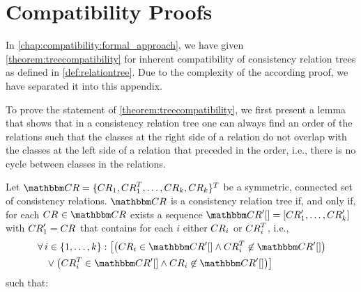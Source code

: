 \chapter{Compatibility Proofs}
\label{chap:appendix:compatibility_proofs}

In \autoref{chap:compatibility:formal_approach}, we have given \autoref{theorem:treecompatibility} for inherent compatibility of consistency relation trees as defined in \autoref{def:relationtree}.
Due to the complexity of the according proof, we have separated it into this appendix.

To prove the statement of \autoref{theorem:treecompatibility}, we first present a lemma that shows that in a consistency relation tree one can always find an order of the relations such that the classes at the right side of a relation do not overlap with the classes at the left side of a relation that preceded in the order, i.e., there is no cycle between classes in the relations.

\begin{lemma} \label{lemma:treehassequence}
    Let $\consistencyrelationset{CR} = \setted{\consistencyrelation{CR}{1}, \consistencyrelation{CR}{1}^T, \dots, \consistencyrelation{CR}{k}, \consistencyrelation{CR}{k}}^T$ be a symmetric, connected set of consistency relations.
    $\consistencyrelationset{CR}$ is a consistency relation tree if, and only if, for each $\consistencyrelation{CR}{} \in \consistencyrelationset{CR}$ exists a sequence $\sequence{\consistencyrelationset{CR}'} = \sequenced{\consistencyrelation{CR}{1}', \dots, \consistencyrelation{CR}{k}'}$ with $\consistencyrelation{CR}{1}' = \consistencyrelation{CR}{}$ that contains for each $i$ either $\consistencyrelation{CR}{i}$ or $\consistencyrelation{CR}{i}^T$, i.e.,
    \begin{align*}
        &
        \forall i \in \setted{1, \dots, k} :
        \big[
            \big(
                \consistencyrelation{CR}{i} \in \sequence{\consistencyrelationset{CR}'}
                \land \consistencyrelation{CR}{i}^T \not\in \sequence{\consistencyrelationset{CR}'}
            \big)\\
            & \formulaskip 
            \lor \big(
                \consistencyrelation{CR}{i}^T \in \sequence{\consistencyrelationset{CR}'}
                \land \consistencyrelation{CR}{i} \not\in \sequence{\consistencyrelationset{CR}'}
            \big)
        \big]
    \end{align*}
    such that:
\end{lemma}

